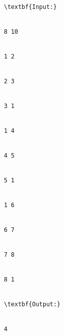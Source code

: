 \begin{verbatim}
\textbf{Input:}


8 10


1 2


2 3


3 1


1 4


4 5


5 1


1 6


6 7


7 8


8 1


\textbf{Output:}


4


\end{verbatim}